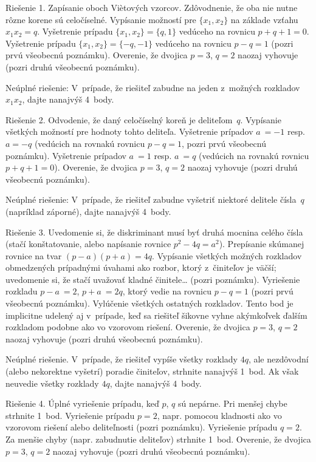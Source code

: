 {\smallskip
{Riešenie 1.}
\* [1 bod] Zapísanie oboch Vi\`etových vzorcov.
\* [1 bod] Zdôvodnenie, že oba nie nutne rôzne korene sú
celočíselné.
\* [1 bod] Vypísanie možností pre $\{x_1, x_2\}$ na základe
vzťahu $x_1x_2 = q$.
\* [1 bod] Vyšetrenie prípadu $\{x_1, x_2\} = \{q, 1\}$
vedúceho na rovnicu $p+q+1 = 0$.
\* [1 bod] Vyšetrenie prípadu $\{x_1, x_2\} = \{{-q},{-1}\}$
vedúceho na rovnicu $p-q = 1$ (pozri prvú všeobecnú poznámku).
\* [1 bod] Overenie, že dvojica $p = 3$, $q = 2$ naozaj vyhovuje
(pozri druhú všeobecnú poznámku).

\item{}Neúplné riešenie:
V~prípade, že riešiteľ zabudne na jeden z~možných rozkladov
$x_1x_2$, dajte nanajvýš 4~body.

\smallskip
{Riešenie 2.}
\* [2 body] Odvodenie, že daný celočíselný koreň je deliteľom~$q$.
\* [1 bod] Vypísanie všetkých možností pre
hodnoty tohto deliteľa.
\* [1 bod] Vyšetrenie prípadov $a~={-1}$ resp. $a={-q}$
(vedúcich na rovnakú rovnicu $p-q = 1$, pozri prvú všeobecnú poznámku).
\* [1 bod] Vyšetrenie prípadov $a~= 1$ resp. $a~= q$ (vedúcich
na rovnakú rovnicu $p+q+1 = 0$).
\* [1 bod] Overenie, že dvojica $p = 3$, $q = 2$ naozaj vyhovuje
(pozri druhú všeobecnú poznámku).

\item{}Neúplné riešenie:
V~prípade, že riešiteľ zabudne vyšetriť niektoré delitele
čísla~$q$ (napríklad záporné), dajte nanajvýš 4~body.

\smallskip
{Riešenie 3.}
\* [1 bod] Uvedomenie si, že diskriminant musí byť druhá
mocnina celého čísla (stačí konštatovanie, alebo napísanie
rovnice $p^2-4q = a^2$).
\* [1 bod] Prepísanie skúmanej rovnice na tvar $(p-a) (p+a)= 4q$.
\* [1 bod] Vypísanie všetkých možných rozkladov obmedzených prípadnými úvahami ako
rozbor, ktorý z~činiteľov je väčší; uvedomenie si, že stačí uvažovať kladné
činitele\dots{} (pozri poznámku).
\* [1 bod] Vyriešenie rozkladu $p-a~= 2$, $p+a~= 2q$, ktorý
vedie na rovnicu $p-q = 1$ (pozri prvú všeobecnú poznámku).
\* [1 bod] Vylúčenie všetkých ostatných rozkladov. Tento
bod je implicitne udelený aj v~prípade, keď sa riešiteľ šikovne
vyhne akýmkoľvek ďalším rozkladom podobne ako vo vzorovom
riešení.
\* [1 bod] Overenie, že dvojica $p = 3$, $q = 2$ naozaj vyhovuje
(pozri druhú všeobecnú poznámku).

\item{}Neúplné riešenie.
V~prípade, že riešiteľ vypíše všetky rozklady $4q$, ale
nezdôvodní (alebo nekorektne vyšetrí) poradie činiteľov,
strhnite nanajvýš 1~bod. Ak však neuvedie všetky rozklady $4q$,
dajte nanajvýš 4~body.

\smallskip
{Riešenie 4.}
\* [2 body] Úplné vyriešenie prípadu, keď $p$, $q$ sú
nepárne. Pri menšej chybe strhnite 1~bod.
\* [1 bod] Vyriešenie prípadu $p = 2$, napr. pomocou kladnosti
ako vo vzorovom riešení alebo deliteľnosti (pozri poznámku).
\* [2 body] Vyriešenie prípadu $q = 2$. Za menšie chyby
(napr. zabudnutie deliteľov) strhnite 1~bod.
\* [1 bod] Overenie, že dvojica $p = 3$, $q = 2$ naozaj vyhovuje
(pozri druhú všeobecnú poznámku).

\endpetit\bigskip
}

